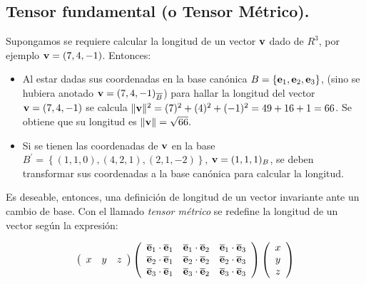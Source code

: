 \bigskip




\bigskip





\subsection{Tensor fundamental (o Tensor Métrico).}

Supongamos se requiere calcular la longitud de un vector $\bold{v}$ dado de $R^3$, por ejemplo $\bold{v}=(7,4,-1)$. Entonces:

\begin{itemize}
    \item 
  Al estar dadas   sus coordenadas  en la base canónica  $B= \left\{\bold{e}_1,\bold{e}_2, \bold{e}_3\right\}$, (sino se hubiera anotado  $\bold{v}=(7,4,-1)_{\overline B}$)  para hallar la longitud  del vector $\bold{v}=(7,4,-1)$ se calcula $\| \bold v\|^2 = (7)^2+(4)^2+(-1)^2= 49+16+1=66$. Se obtiene que su longitud es  $\| \bold v\|=\sqrt{66}.$
     \item
     
Si se tienen las coordenadas de $\bold{v}$ en la base $B^{\prime} =\left\{(1,1,0), (4,2,1),(2,1,-2)\right\}$,  $\bold{v}=(1,1,1)_{B}$, se deben transformar sus coordenadas a la base canónica para calcular la longitud.
\end{itemize}



\bigskip 
 
 
 Es deseable, entonces,  una definición de longitud de un vector invariante ante un cambio de base. Con  el llamado \textit{tensor métrico} se redefine la longitud de un vector según la expresión: 
 
   \begin{equation}
\left(\begin{array}{ccc} x & y & z 
\end{array}
 \right) \left(\begin{array}{ccc} \overline {\bold{e}}_1 \cdot \overline {\bold{e}}_1  & \overline {\bold{e}}_1 \cdot \overline {\bold{e}}_2  & \overline {\bold{e}}_1 \cdot \overline {\bold{e}}_3   \\ \overline {\bold{e}}_2 \cdot \overline {\bold{e}}_1 & \overline {\bold{e}}_2 \cdot \overline {\bold{e}}_2  & \overline {\bold{e}}_2 \cdot \overline {\bold{e}}_3  \\\overline {\bold{e}}_3 \cdot \overline {\bold{e}}_1   & \overline {\bold{e}}_3 \cdot \overline {\bold{e}}_2 & \overline {\bold{e}}_3 \cdot \overline {\bold{e}}_3
\end{array}
 \right)  \left(\begin{array}{c} x \\y  \\z
\end{array}
 \right)\label{tensorm}
\end{equation}

